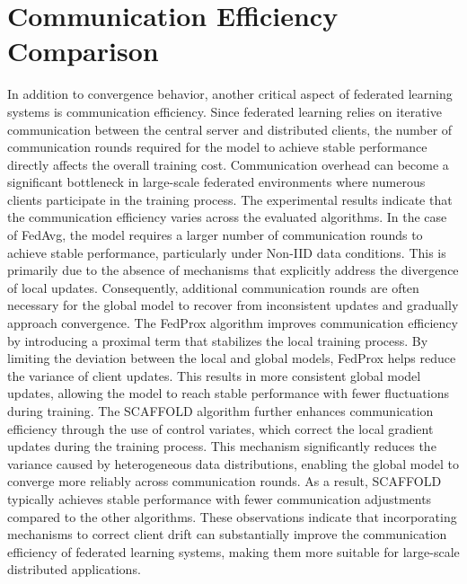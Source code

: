 \documentclass[12pt]{book}
\begin{document}
\section{Communication Efficiency Comparison}
In addition to convergence behavior, another critical aspect of federated learning systems is communication efficiency. Since federated learning relies on iterative communication between the central server and distributed clients, the number of communication rounds required for the model to achieve stable performance directly affects the overall training cost. Communication overhead can become a significant bottleneck in large-scale federated environments where numerous clients participate in the training process.
The experimental results indicate that the communication efficiency varies across the evaluated algorithms. In the case of FedAvg, the model requires a larger number of communication rounds to achieve stable performance, particularly under Non-IID data conditions. This is primarily due to the absence of mechanisms that explicitly address the divergence of local updates. Consequently, additional communication rounds are often necessary for the global model to recover from inconsistent updates and gradually approach convergence.
The FedProx algorithm improves communication efficiency by introducing a proximal term that stabilizes the local training process. By limiting the deviation between the local and global models, FedProx helps reduce the variance of client updates. This results in more consistent global model updates, allowing the model to reach stable performance with fewer fluctuations during training.
The SCAFFOLD algorithm further enhances communication efficiency through the use of control variates, which correct the local gradient updates during the training process. This mechanism significantly reduces the variance caused by heterogeneous data distributions, enabling the global model to converge more reliably across communication rounds. As a result, SCAFFOLD typically achieves stable performance with fewer communication adjustments compared to the other algorithms.
These observations indicate that incorporating mechanisms to correct client drift can substantially improve the communication efficiency of federated learning systems, making them more suitable for large-scale distributed applications.
\end{document}
